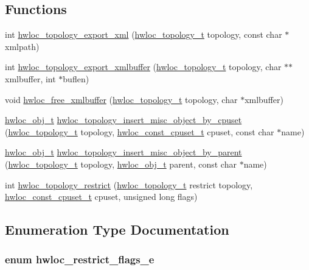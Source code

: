 \subsection*{Functions}
\begin{DoxyCompactItemize}
\item 
 int \hyperlink{a00045_ga45578d725c66865cfef31d0585dcff70}{hwloc\_\-topology\_\-export\_\-xml} (\hyperlink{a00039_ga9d1e76ee15a7dee158b786c30b6a6e38}{hwloc\_\-topology\_\-t} topology, const char $\ast$xmlpath)
\item 
 int \hyperlink{a00045_ga739330e9402425315e44e5012631fb91}{hwloc\_\-topology\_\-export\_\-xmlbuffer} (\hyperlink{a00039_ga9d1e76ee15a7dee158b786c30b6a6e38}{hwloc\_\-topology\_\-t} topology, char $\ast$$\ast$xmlbuffer, int $\ast$buflen)
\item 
 void \hyperlink{a00045_ga5e375acef034bebc1f20ead884697301}{hwloc\_\-free\_\-xmlbuffer} (\hyperlink{a00039_ga9d1e76ee15a7dee158b786c30b6a6e38}{hwloc\_\-topology\_\-t} topology, char $\ast$xmlbuffer)
\item 
 \hyperlink{a00016}{hwloc\_\-obj\_\-t} \hyperlink{a00045_ga017a9ba16d554326c6e3812d545d7230}{hwloc\_\-topology\_\-insert\_\-misc\_\-object\_\-by\_\-cpuset} (\hyperlink{a00039_ga9d1e76ee15a7dee158b786c30b6a6e38}{hwloc\_\-topology\_\-t} topology, \hyperlink{a00040_ga1f784433e9b606261f62d1134f6a3b25}{hwloc\_\-const\_\-cpuset\_\-t} cpuset, const char $\ast$name)
\item 
 \hyperlink{a00016}{hwloc\_\-obj\_\-t} \hyperlink{a00045_gadacd7a3d21220fbb30c3256d8b22a294}{hwloc\_\-topology\_\-insert\_\-misc\_\-object\_\-by\_\-parent} (\hyperlink{a00039_ga9d1e76ee15a7dee158b786c30b6a6e38}{hwloc\_\-topology\_\-t} topology, \hyperlink{a00016}{hwloc\_\-obj\_\-t} parent, const char $\ast$name)
\item 
 int \hyperlink{a00045_gad75fa918e3eb54663bdeab25ed89b648}{hwloc\_\-topology\_\-restrict} (\hyperlink{a00039_ga9d1e76ee15a7dee158b786c30b6a6e38}{hwloc\_\-topology\_\-t} restrict topology, \hyperlink{a00040_ga1f784433e9b606261f62d1134f6a3b25}{hwloc\_\-const\_\-cpuset\_\-t} cpuset, unsigned long flags)
\end{DoxyCompactItemize}


\subsection{Enumeration Type Documentation}
\hypertarget{a00045_ga9d80f08eb25b7ac22f1b998dc8bf521f}{
\subsubsection[{hwloc\_\-restrict\_\-flags\_\-e}]{\setlength{\rightskip}{0pt plus 5cm}enum {\bf hwloc\_\-restrict\_\-flags\_\-e}}}
\label{a00045_ga9d80f08eb25b7ac22f1b998dc8bf521f}


